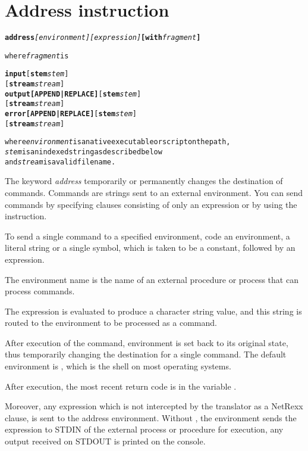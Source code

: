 \chapter{Address instruction}\label{refaddress}
\begin{shaded}
  \begin{alltt}
  \textbf{address} \emph{[environment]} \emph{[expression]} \textbf{[with} \emph{fragment}\textbf{]}

  where \emph{fragment} is
  
  \textbf{input} [\textbf{stem} \emph{stem}]
             [\textbf{stream} \emph{stream}]
	  \textbf{output} \textbf{[APPEND|REPLACE]} [\textbf{stem} \emph{stem}]
                          [\textbf{stream} \emph{stream}]
	  \textbf{error} \textbf{[APPEND|REPLACE]} [\textbf{stem} \emph{stem}]
                         [\textbf{stream} \emph{stream}]
                
where \emph{environment} is a native executable or script on the path,
\emph{stem} is an indexed string as described below
and \emph{stream} is a valid filename.
\end{alltt}

% 
\end{shaded}
The keyword \emph{address} temporarily or permanently changes the destination of commands. Commands are strings sent to an external environment. You can send commands by specifying clauses consisting of only an expression or by using the  instruction.

To send a single command to a specified environment, code an
environment, a literal string or a single symbol, which is taken to be
a constant, followed by an expression.

The environment name is the
name of an external procedure or process that can process
commands.

The expression is evaluated to produce a character string
value, and this string is routed to the environment to be processed as
a command.

After execution of the command, environment is set back to
its original state, thus temporarily changing the destination for a
single command. The default environment is , which is the shell
on most operating systems.

After execution, the most recent return code is in the variable .

Moreover, any expression which is not intercepted by the translator as a NetRexx clause, is sent to the address environment.
Without , the environment sends the expression to STDIN of the external process or procedure for execution, any output received on STDOUT is printed on the console.

